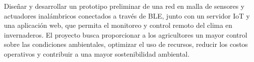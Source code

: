 Diseñar y desarrollar un prototipo preliminar de una red en malla de sensores y
actuadores inalámbricos conectados a través de BLE, junto con un servidor IoT y
una aplicación web, que permita el monitoreo y control remoto del clima en
invernaderos. El proyecto busca proporcionar a los agricultores un mayor
control sobre las condiciones ambientales, optimizar el uso de recursos,
reducir los costos operativos y contribuir a una mayor sostenibilidad
ambiental.
